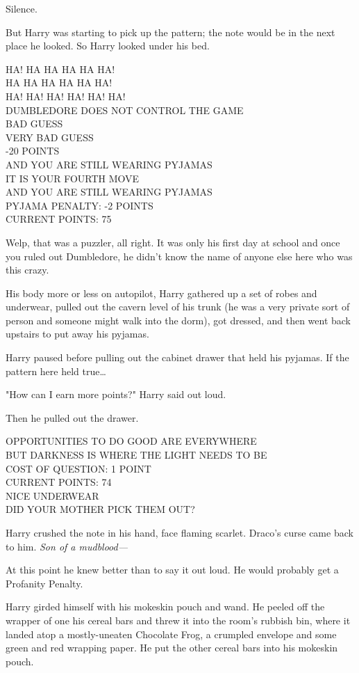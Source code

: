 Silence.

But Harry was starting to pick up the pattern; the note would be in the next 
place he looked. So Harry looked under his bed.

HA! HA HA HA HA HA!\\
HA HA HA HA HA HA!\\
HA! HA! HA! HA! HA! HA!\\
DUMBLEDORE DOES NOT CONTROL THE GAME\\
BAD GUESS\\
VERY BAD GUESS\\
-20 POINTS\\
AND YOU ARE STILL WEARING PYJAMAS\\
IT IS YOUR FOURTH MOVE\\
AND YOU ARE STILL WEARING PYJAMAS\\
PYJAMA PENALTY: -2 POINTS\\
CURRENT POINTS: 75

Welp, that was a puzzler, all right. It was only his first day at school and 
once you ruled out Dumbledore, he didn't know the name of anyone else here who 
was this crazy.

His body more or less on autopilot, Harry gathered up a set of robes and 
underwear, pulled out the cavern level of his trunk (he was a very private sort 
of person and someone might walk into the dorm), got dressed, and then went 
back upstairs to put away his pyjamas.

Harry paused before pulling out the cabinet drawer that held his pyjamas. If 
the pattern here held true{\ldots}

"How can I earn more points?" Harry said out loud.

Then he pulled out the drawer.

OPPORTUNITIES TO DO GOOD ARE EVERYWHERE\\
BUT DARKNESS IS WHERE THE LIGHT NEEDS TO BE\\
COST OF QUESTION: 1 POINT\\
CURRENT POINTS: 74\\
NICE UNDERWEAR\\
DID YOUR MOTHER PICK THEM OUT?

Harry crushed the note in his hand, face flaming scarlet. Draco's curse came 
back to him. \emph{Son of a mudblood---}

At this point he knew better than to say it out loud. He would probably get a 
Profanity Penalty.

Harry girded himself with his mokeskin pouch and wand. He peeled off the 
wrapper of one his cereal bars and threw it into the room's rubbish bin, where 
it landed atop a mostly-uneaten Chocolate Frog, a crumpled envelope and some 
green and red wrapping paper. He put the other cereal bars into his mokeskin 
pouch.

